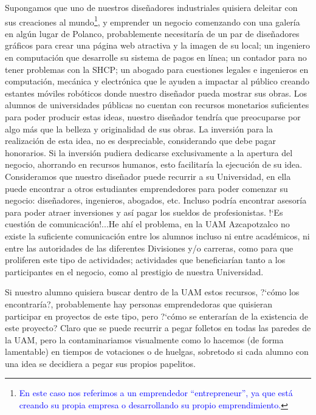 \documentclass[11pt,letterpaper,titlepage]{article}
\begin{document}
Supongamos que uno de nuestros dise\~nadores industriales quisiera deleitar con sus creaciones al mundo\footnote{\textcolor{blue}{En este caso nos referimos a un emprendedor ``entrepreneur'', ya que est\'a creando su propia empresa o desarrollando su propio emprendimiento.\cite{emprendedurismo}}}, y emprender un negocio comenzando con una galer\'ia en alg\'un lugar de Polanco, probablemente necesitar\'ia de un par de dise\~nadores gr\'aficos para crear una p\'agina web atractiva y la imagen de su local; un ingeniero en computaci\'on que desarrolle su sistema de pagos en l\'inea; un contador para no tener problemas con la SHCP; un abogado para cuestiones legales e ingenieros en computaci\'on, mec\'anica y electr\'onica que le ayuden a impactar al p\'ublico creando estantes m\'oviles rob\'oticos donde nuestro dise\~nador pueda mostrar sus obras. Los alumnos de universidades p\'ublicas no cuentan con recursos monetarios suficientes para poder producir estas ideas, nuestro dise\~nador tendr\'ia que preocuparse por algo m\'as que la belleza y originalidad de sus obras. La inversi\'on para la realizaci\'on de esta idea, no es despreciable, considerando que debe pagar honorarios. Si la inversi\'on pudiera dedicarse exclusivamente a la apertura del negocio, ahorrando en recursos humanos, esto facilitar\'ia la ejecuci\'on de su idea. Consideramos que nuestro dise\~nador puede recurrir a su Universidad, en ella puede encontrar a otros estudiantes emprendedores para poder comenzar su negocio: dise\~nadores, ingenieros, abogados, etc. Incluso podr\'ia encontrar asesor\'ia para poder atraer inversiones y as\'i pagar los sueldos de profesionistas. !`Es cuesti\'on de comunicaci\'on!...He ah\'i el problema, en la UAM Azcapotzalco no existe la suficiente comunicaci\'on \-entre los alumnos incluso ni entre acad\'emicos, ni entre las autoridades de las diferentes Divisiones y/o carreras\-, como para que proliferen este tipo de actividades; actividades que beneficiar\'ian tanto a los participantes en el negocio, como al prestigio de nuestra Universidad.

Si nuestro alumno quisiera buscar dentro de la UAM estos recursos, ?`c\'omo los encontrar\'ia?, probablemente hay personas emprendedoras que quisieran participar en proyectos de este tipo, pero ?`c\'omo se enterar\'ian de la existencia de este proyecto? Claro que se puede recurrir a pegar folletos en todas las paredes de la UAM, pero la contaminariamos visualmente como lo hacemos (de forma lamentable) en tiempos de votaciones o de huelgas, sobretodo si cada alumno con una idea se decidiera a pegar sus propios papelitos.
\end{document}
